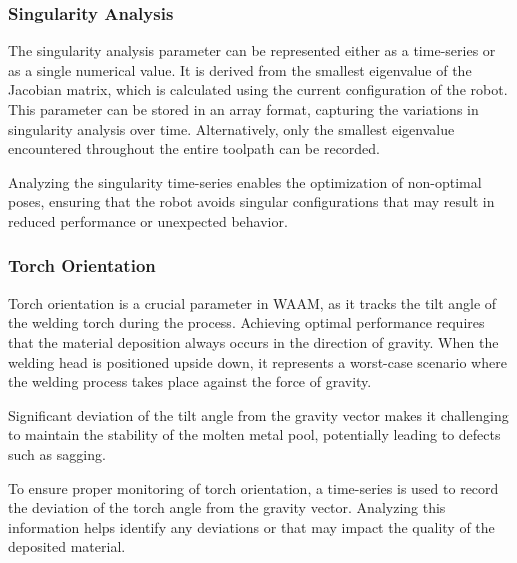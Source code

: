 \subsubsection*{Singularity Analysis}
The singularity analysis parameter can be represented either as a time-series or as a single numerical value. It is derived from the smallest eigenvalue of the Jacobian matrix, which is calculated using the current configuration of the robot. This parameter can be stored in an array format, capturing the variations in singularity analysis over time. Alternatively, only the smallest eigenvalue encountered throughout the entire toolpath can be recorded.

Analyzing the singularity time-series enables the optimization of non-optimal poses, ensuring that the robot avoids singular configurations that may result in reduced performance or unexpected behavior.



\subsubsection*{Torch Orientation}
Torch orientation is a crucial parameter in \acrshort{WAAM}, as it tracks the tilt angle of the welding torch during the process. Achieving optimal performance requires that the material deposition always occurs in the direction of gravity. When the welding head is positioned upside down, it represents a worst-case scenario where the welding process takes place against the force of gravity.

Significant deviation of the tilt angle from the gravity vector makes it challenging to maintain the stability of the molten metal pool, potentially leading to defects such as sagging.

To ensure proper monitoring of torch orientation, a time-series is used to record the deviation of the torch angle from the gravity vector. Analyzing this information helps identify any deviations or that may impact the quality of the deposited material.







